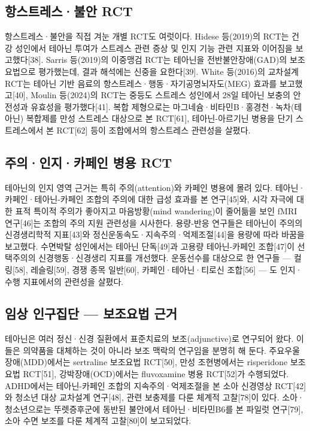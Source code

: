 \documentclass[12pt,oneside]{book}
\begin{document}
\subsection{항스트레스·불안 RCT}

항스트레스·불안을 직접 겨눈 개별 RCT도 여럿이다. Hidese 등(2019)의 RCT는 건강 성인에서 테아닌 투여가 스트레스 관련 증상 및 인지 기능 관련 지표와 이어짐을 보고했다[38]. Sarris 등(2019)의 이중맹검 RCT는 테아닌을 전반불안장애(GAD)의 보조요법으로 평가했는데, 결과 해석에는 신중을 요한다[39]. White 등(2016)의 교차설계 RCT는 테아닌 기반 음료의 항스트레스·행동·자기공명뇌자도(MEG) 효과를 보고했고[40], Moulin 등(2024)의 RCT는 중등도 스트레스 성인에서 28일 테아닌 보충의 안전성과 유효성을 평가했다[41]. 복합 제형으로는 마그네슘·비타민B·홍경천·녹차(테아닌) 복합제를 만성 스트레스 대상으로 본 RCT[61], 테아닌-아르기닌 병용을 단기 스트레스에서 본 RCT[62] 등이 조합에서의 항스트레스 관련성을 살폈다.

\subsection{주의·인지·카페인 병용 RCT}

테아닌의 인지 영역 근거는 특히 주의(attention)와 카페인 병용에 몰려 있다. 테아닌·카페인·테아닌-카페인 조합의 주의에 대한 급성 효과를 본 연구[45]와, 시각 자극에 대한 표적 특이적 주의가 좋아지고 마음방황(mind wandering)이 줄어듦을 보인 fMRI 연구[46]는 조합의 주의 지원 관련성을 시사한다. 용량-반응 연구들은 테아닌이 주의의 신경생리학적 지표[43]와 정신운동속도·지속주의·억제조절[44]을 용량에 따라 바꿈을 보고했다. 수면박탈 성인에서는 테아닌 단독[49]과 고용량 테아닌-카페인 조합[47]이 선택주의의 신경행동·신경생리 지표를 개선했다. 운동선수를 대상으로 한 연구들 — 컬링[58], 레슬링[59], 경쟁 종목 일반[60], 카페인·테아닌·티로신 조합[56] — 도 인지·수행 지표에서의 관련성을 살폈다.

\subsection{임상 인구집단 — 보조요법 근거}

테아닌은 여러 정신·신경 질환에서 표준치료의 보조(adjunctive)로 연구되어 왔다. 이들은 의약품을 대체하는 것이 아니라 보조 맥락의 연구임을 분명히 해 둔다. 주요우울장애(MDD)에서는 sertraline 보조요법 RCT[50], 만성 조현병에서는 risperidone 보조요법 RCT[51], 강박장애(OCD)에서는 fluvoxamine 병용 RCT[52]가 수행되었다. ADHD에서는 테아닌-카페인 조합의 지속주의·억제조절을 본 소아 신경영상 RCT[42]와 청소년 대상 교차설계 연구[48], 관련 보충제를 다룬 체계적 고찰[78]이 있다. 소아·청소년으로는 뚜렛증후군에 동반된 불안에서 테아닌·비타민B6를 본 파일럿 연구[79], 소아 수면 보조를 다룬 체계적 고찰[80]이 보고되었다.
\end{document}
